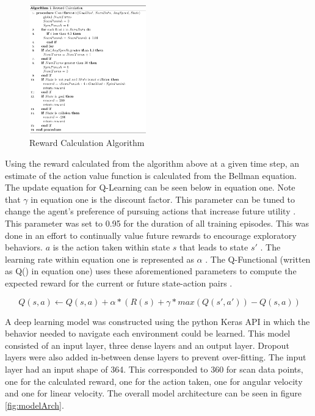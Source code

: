\documentclass[conference]{IEEEtran}
\begin{document}
\begin{figure}[h!]
\centering
\includegraphics[width=0.45\textwidth]{"rewardAlg.png"}
\caption{Reward Calculation Algorithm}
\label{fig:rewardCalc}
\end{figure}

Using the reward calculated from the algorithm above at a given time step, an estimate of the action value function is calculated from the Bellman equation. The update equation for Q-Learning can be seen below in equation one. Note that $\gamma$ in equation one is the discount factor. This parameter can be tuned to change the agent's preference of pursuing actions that increase future utility \cite{b6}. This parameter was set to 0.95 for the duration of all training episodes. This was done in an effort to continually value future rewards to encourage exploratory behaviors. $a$ is the action taken within state $s$ that leads to state $s'$ \cite{b6}. The learning rate within equation one is represented as $\alpha$ \cite{b6}. The Q-Functional (written as Q() in equation one) uses these aforementioned parameters to compute the expected reward for the current or future state-action pairs \cite{b6}.

\begin{equation}
\ Q(s, a) \leftarrow Q(s, a) + \alpha*(R(s) + \gamma*max(Q(s', a')) - Q(s, a))
\end{equation}\cite{b6}

A deep learning model was constructed using the python Keras API in which the behavior needed to navigate each environment could be learned. This model consisted of an input layer, three dense layers and an output layer. Dropout layers were also added in-between dense layers to prevent over-fitting. The input layer had an input shape of 364. This corresponded to 360 for scan data points, one for the calculated reward, one for the action taken, one for angular velocity and one for linear velocity.  The overall model architecture can be seen in figure \ref{fig:modelArch}.
\end{document}

